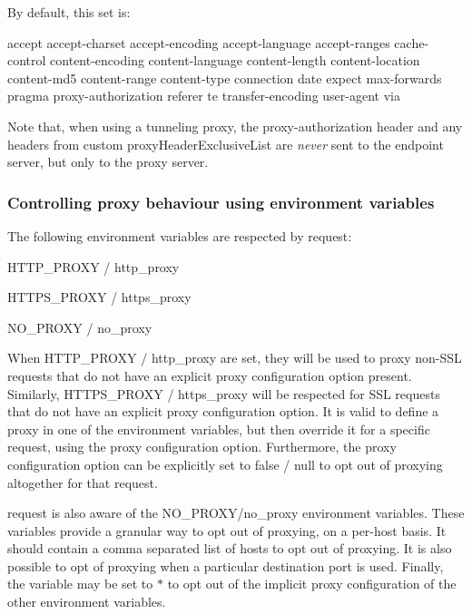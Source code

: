 By default, this set is\+:


\begin{DoxyCode}
accept
accept-charset
accept-encoding
accept-language
accept-ranges
cache-control
content-encoding
content-language
content-length
content-location
content-md5
content-range
content-type
connection
date
expect
max-forwards
pragma
proxy-authorization
referer
te
transfer-encoding
user-agent
via
\end{DoxyCode}


Note that, when using a tunneling proxy, the {\ttfamily proxy-\/authorization} header and any headers from custom {\ttfamily proxy\+Header\+Exclusive\+List} are {\itshape never} sent to the endpoint server, but only to the proxy server.

\subsubsection*{Controlling proxy behaviour using environment variables}

The following environment variables are respected by {\ttfamily request}\+:


\begin{DoxyItemize}
\item {\ttfamily H\+T\+T\+P\+\_\+\+P\+R\+O\+XY} / {\ttfamily http\+\_\+proxy}
\item {\ttfamily H\+T\+T\+P\+S\+\_\+\+P\+R\+O\+XY} / {\ttfamily https\+\_\+proxy}
\item {\ttfamily N\+O\+\_\+\+P\+R\+O\+XY} / {\ttfamily no\+\_\+proxy}
\end{DoxyItemize}

When {\ttfamily H\+T\+T\+P\+\_\+\+P\+R\+O\+XY} / {\ttfamily http\+\_\+proxy} are set, they will be used to proxy non-\/\+S\+SL requests that do not have an explicit {\ttfamily proxy} configuration option present. Similarly, {\ttfamily H\+T\+T\+P\+S\+\_\+\+P\+R\+O\+XY} / {\ttfamily https\+\_\+proxy} will be respected for S\+SL requests that do not have an explicit {\ttfamily proxy} configuration option. It is valid to define a proxy in one of the environment variables, but then override it for a specific request, using the {\ttfamily proxy} configuration option. Furthermore, the {\ttfamily proxy} configuration option can be explicitly set to false / null to opt out of proxying altogether for that request.

{\ttfamily request} is also aware of the {\ttfamily N\+O\+\_\+\+P\+R\+O\+XY}/{\ttfamily no\+\_\+proxy} environment variables. These variables provide a granular way to opt out of proxying, on a per-\/host basis. It should contain a comma separated list of hosts to opt out of proxying. It is also possible to opt of proxying when a particular destination port is used. Finally, the variable may be set to {\ttfamily $\ast$} to opt out of the implicit proxy configuration of the other environment variables.

